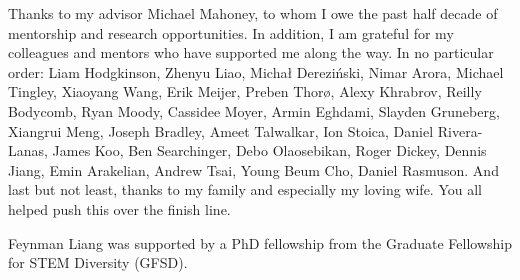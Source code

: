 \documentclass[oldfontcommands]{ucbthesis}
\numberwithin{theorem}{chapter}
\numberwithin{example}{chapter}
\numberwithin{condition}{chapter}
\numberwithin{property}{chapter}
\numberwithin{lemma}{chapter}
\numberwithin{proposition}{chapter}
\numberwithin{remark}{chapter}
\numberwithin{corollary}{chapter}
\numberwithin{definition}{chapter}
\numberwithin{conjecture}{chapter}
\numberwithin{axiom}{chapter}
\numberwithin{claim}{chapter}
\numberwithin{assumption}{chapter}
\numberwithin{condition}{chapter}
\numberwithin{question}{chapter}
\begin{document}
\begin{frontmatter}

  \begin{dedication}
    \null\vfil
    \begin{center}
      Thanks to my advisor Michael Mahoney, to whom I owe the past half decade
      of mentorship and research opportunities. In addition, I am grateful for my colleagues and mentors who have supported me along the way. In no particular order:
      Liam Hodgkinson, Zhenyu Liao, Micha{\l} Derezi\'{n}ski, Nimar Arora, Michael Tingley, Xiaoyang Wang,
      Erik Meijer, Preben Thor\o , Alexy Khrabrov, Reilly Bodycomb, Ryan Moody, Cassidee Moyer, Armin Eghdami,
      Slayden Gruneberg, Xiangrui Meng, Joseph Bradley,
      Ameet Talwalkar, Ion Stoica, Daniel Rivera-Lanas, James Koo, Ben Searchinger, Debo Olaosebikan, Roger Dickey, Dennis Jiang, Emin Arakelian, Andrew Tsai, Young Beum Cho, Daniel Rasmuson. And last but not least,
      thanks to my family and especially my loving
      wife. You all helped push this over the finish line.
    \end{center}
    \vfil\null
  \end{dedication}


  \tableofcontents

  \begin{acknowledgements}
    Feynman Liang was supported by a PhD fellowship from the Graduate Fellowship for STEM Diversity (GFSD).
  \end{acknowledgements}
\end{frontmatter}

\pagestyle{headings}








\end{document}
